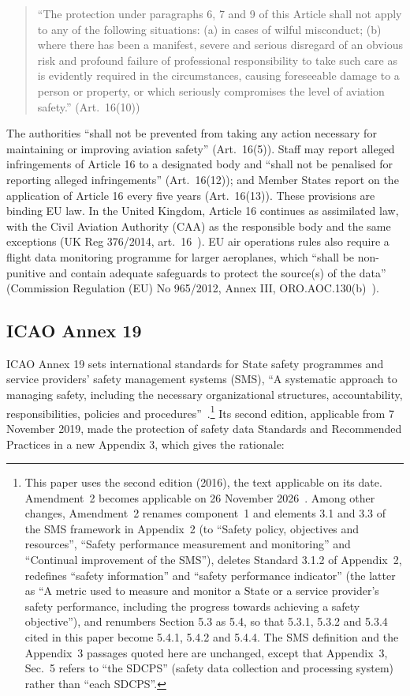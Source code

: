 \documentclass[11pt]{article}
\begin{document}
\begin{quote}
``The protection under paragraphs 6, 7 and 9 of this Article shall not apply to any of the following situations: (a) in cases of wilful misconduct; (b) where there has been a manifest, severe and serious disregard of an obvious risk and profound failure of professional responsibility to take such care as is evidently required in the circumstances, causing foreseeable damage to a person or property, or which seriously compromises the level of aviation safety.'' (Art.~16(10))
\end{quote}

The authorities ``shall not be prevented from taking any action necessary for maintaining or improving aviation safety'' (Art.~16(5)). Staff may report alleged infringements of Article 16 to a designated body and ``shall not be penalised for reporting alleged infringements'' (Art.~16(12)); and Member States report on the application of Article 16 every five years (Art.~16(13)). These provisions are binding EU law. In the United Kingdom, Article 16 continues as assimilated law, with the Civil Aviation Authority (CAA) as the responsible body and the same exceptions (UK Reg 376/2014, art.~16~\cite{uk376}). EU air operations rules also require a flight data monitoring programme for larger aeroplanes, which ``shall be non-punitive and contain adequate safeguards to protect the source(s) of the data'' (Commission Regulation (EU) No 965/2012, Annex III, ORO.AOC.130(b)~\cite{eu965}).

\subsection{ICAO Annex 19}\label{sec:icao}

ICAO Annex 19 sets international standards for State safety programmes and service providers' safety management systems (SMS), ``A systematic approach to managing safety, including the necessary organizational structures, accountability, responsibilities, policies and procedures''~\cite[Chapter~1]{icao2016}.\footnote{This paper uses the second edition (2016), the text applicable on its date. Amendment~2 becomes applicable on 26 November 2026~\cite{icao2025}. Among other changes, Amendment~2 renames component~1 and elements 3.1 and 3.3 of the SMS framework in Appendix~2 (to ``Safety policy, objectives and resources'', ``Safety performance measurement and monitoring'' and ``Continual improvement of the SMS''), deletes Standard 3.1.2 of Appendix~2, redefines ``safety information'' and ``safety performance indicator'' (the latter as ``A metric used to measure and monitor a State or a service provider's safety performance, including the progress towards achieving a safety objective''), and renumbers Section 5.3 as 5.4, so that 5.3.1, 5.3.2 and 5.3.4 cited in this paper become 5.4.1, 5.4.2 and 5.4.4. The SMS definition and the Appendix~3 passages quoted here are unchanged, except that Appendix~3, Sec.~5 refers to ``the SDCPS'' (safety data collection and processing system) rather than ``each SDCPS''.} Its second edition, applicable from 7 November 2019, made the protection of safety data Standards and Recommended Practices in a new Appendix 3, which gives the rationale:
\end{document}

